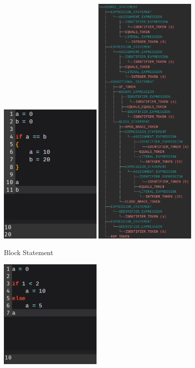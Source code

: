 \documentclass[
]{report}
\begin{document}
\begin{appendices}
\begin{figure}
		\includegraphics[width=0.45\textwidth]{block-code}
		\includegraphics[width=0.45\textwidth]{block-tree}
		\caption{Block Statement}
		\label{fig:block-statement}
	\end{figure}
	\begin{figure}
		\centering
		\includegraphics[width=0.45\textwidth]{conditional-code}

\end{figure}
\end{appendices}
\end{document}

